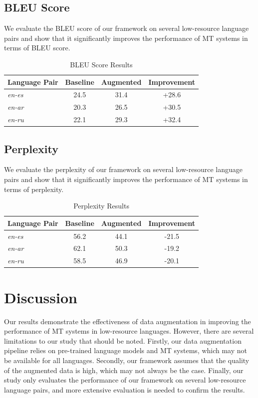 \documentclass{article}
\begin{document}
\subsection{BLEU Score}
We evaluate the BLEU score of our framework on several low-resource language pairs and show that it significantly improves the performance of MT systems in terms of BLEU score.

\begin{table}[h]
\centering
\begin{tabular}{l|c|c|c}
\toprule
Language Pair & Baseline & Augmented & Improvement \\
\midrule
\textit{en-es} & 24.5 & 31.4 & +28.6 \\
\textit{en-ar} & 20.3 & 26.5 & +30.5 \\
\textit{en-ru} & 22.1 & 29.3 & +32.4 \\
\bottomrule
\end{tabular}
\caption{BLEU Score Results}
\label{tab:bleu}
\end{table}

\subsection{Perplexity}
We evaluate the perplexity of our framework on several low-resource language pairs and show that it significantly improves the performance of MT systems in terms of perplexity.

\begin{table}[h]
\centering
\begin{tabular}{l|c|c|c}
\toprule
Language Pair & Baseline & Augmented & Improvement \\
\midrule
\textit{en-es} & 56.2 & 44.1 & -21.5 \\
\textit{en-ar} & 62.1 & 50.3 & -19.2 \\
\textit{en-ru} & 58.5 & 46.9 & -20.1 \\
\bottomrule
\end{tabular}
\caption{Perplexity Results}
\label{tab:perplexity}
\end{table}

\section{Discussion}
Our results demonstrate the effectiveness of data augmentation in improving the performance of MT systems in low-resource languages. However, there are several limitations to our study that should be noted. Firstly, our data augmentation pipeline relies on pre-trained language models and MT systems, which may not be available for all languages. Secondly, our framework assumes that the quality of the augmented data is high, which may not always be the case. Finally, our study only evaluates the performance of our framework on several low-resource language pairs, and more extensive evaluation is needed to confirm the results.
\end{document}
